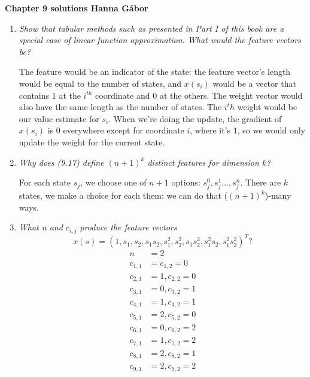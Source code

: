 \documentclass[12pt,a4paper]{article}
\begin{document}
\textbf{Chapter 9 solutions  \hfill Hanna Gábor}

\begin{enumerate}
  \item \textit{Show that tabular methods such as presented in Part I of this book are a
    special case of linear function approximation. What would the feature vectors be?}
    
    The feature would be an indicator of the state: the feature vector's length would be
    equal to the number of states, and $x(s_i)$ would be a vector that contains $1$ at
    the $i^{th}$ coordinate and $0$ at the others. The weight vector would also have
    the same length as the number of states. The $i^th$ weight would be our value estimate
    for $s_i$. When we're doing the update, the gradient of $x(s_i)$ is $0$ everywhere except
    for coordinate $i$, where it's $1$, so we would only update the weight for the current state.
    
  \item \textit{Why does (9.17) define $(n + 1)^k$ distinct features for dimension $k$?}
    
    For each state $s_j$, we choose one of $n + 1$ options: $s_j^0, s_j^1 \dots, s_j^n$.
    There are $k$ states, we make a choice for each them: we can do that ($(n + 1)^k$)-many
    ways.

  \item \textit{What n and $c_{i,j}$ produce the feature vectors
    \[x(s) = (1, s_1, s_2, s_1s_2, s_1^2, s_2^2, s_1s_2^2, s_1^2s_2, s_1^2s_2^2)^T?\]}
    \vspace{-1cm}
    \begin{align*}
    n &= 2 \\
    c_{1, 1} &= c_{1, 2} = 0\\
    c_{2, 1} &= 1, c_{2, 2} = 0\\
    c_{3, 1} &= 0, c_{3, 2} = 1\\
    c_{4, 1} &= 1, c_{4, 2} = 1\\
    c_{5, 1} &= 2, c_{5, 2} = 0\\
    c_{6, 1} &= 0, c_{6, 2} = 2\\
    c_{7, 1} &= 1, c_{7, 2} = 2\\
    c_{8, 1} &= 2, c_{8, 2} = 1\\
    c_{9, 1} &= 2, c_{9, 2} = 2\\
    \end{align*}
\end{enumerate}
\end{document}
